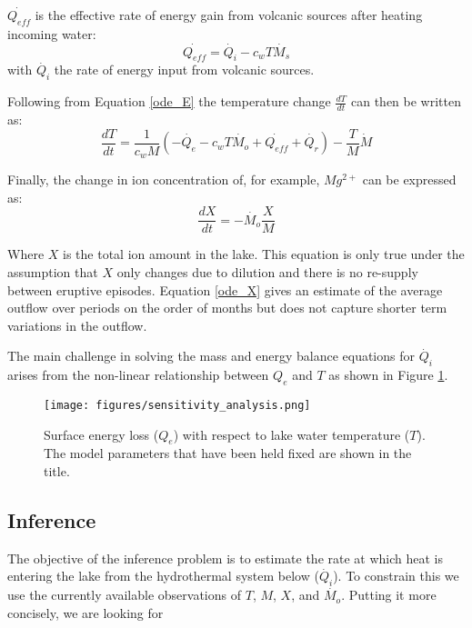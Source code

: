 \documentclass{bmcart}
\begin{document}
$\dot{Q_{eff}}$ is the effective rate of energy gain from volcanic sources after
heating incoming water:
\begin{equation}
	\dot{Q_{eff}}=\dot{Q_i} - c_wT\dot{M_s}
\end{equation}
with $\dot{Q_i}$ the rate of energy input from volcanic sources.

Following from Equation \ref{ode_E} the temperature change $\frac{dT}{dt}$ can then be written as:
\begin{equation}\label{ode_T}
	\frac{dT}{dt}=\frac{1}{c_wM}\left(-\dot{Q_e} - c_wT\dot{M_o} + \dot{Q_{eff}} + \dot{Q_r}\right )
	-\frac{T}{M}\dot{M}
\end{equation}

Finally, the change in ion concentration of, for example, $Mg^{2+}$ can be expressed as:
\begin{equation}\label{ode_X}
	\frac{dX}{dt}=-\dot{M_o}\frac{X}{M}
\end{equation}

Where $X$ is the total ion amount in the lake. This equation is only true under
the assumption that $X$ only changes due to dilution and there is no re-supply
between eruptive episodes. Equation \ref{ode_X} gives an estimate of the average
outflow over periods on the order of months but does not capture shorter term
variations in the outflow.

The main challenge in solving the mass and energy balance equations for
$\dot{Q_i}$ arises from the non-linear relationship between $Q_e$ and ${T}$
as shown in Figure \ref{sens}.

\begin{figure}
    \texttt{[image: figures/sensitivity\_analysis.png]}  
    \caption{Surface energy loss ($Q_e$) with respect to lake water temperature
             ($T$). The model parameters that have been held fixed are shown in  
             the title.}
      \label{sens}
\end{figure}
    

\subsection{Inference}\label{inf}

The objective of the inference problem is to estimate the rate at which heat
is entering the lake from the hydrothermal system below ($\dot{Q_i}$).
To constrain this we use the currently available observations of $T$, $M$,
$X$, and $\dot{M_o}$. Putting it more concisely, we are looking for 
\end{document}
